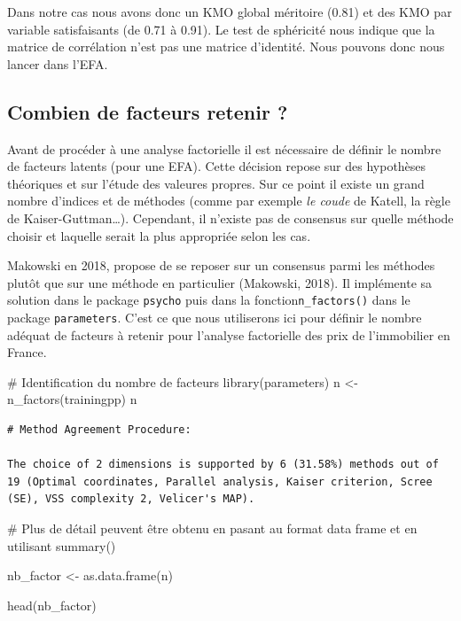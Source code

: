 \documentclass[
  french,
  11pt,
  a4paper,
]{article}
\newenvironment{Shaded}{}{}
\newcommand{\CommentTok}[1]{\textcolor[rgb]{0.42,0.45,0.49}{#1}}
\newcommand{\FunctionTok}[1]{\textcolor[rgb]{0.44,0.26,0.76}{#1}}
\newcommand{\NormalTok}[1]{\textcolor[rgb]{0.14,0.16,0.18}{#1}}
\newcommand{\OtherTok}[1]{\textcolor[rgb]{0.44,0.26,0.76}{#1}}
\begin{document}
Dans notre cas nous avons donc un KMO global méritoire (0.81) et des KMO
par variable satisfaisants (de 0.71 à 0.91). Le test de sphéricité nous
indique que la matrice de corrélation n'est pas une matrice d'identité.
Nous pouvons donc nous lancer dans l'EFA.

\subsection{Combien de facteurs retenir
?}\label{combien-de-facteurs-retenir}

Avant de procéder à une analyse factorielle il est nécessaire de définir
le nombre de facteurs latents (pour une EFA). Cette décision repose sur
des hypothèses théoriques et sur l'étude des valeures propres. Sur ce
point il existe un grand nombre d'indices et de méthodes (comme par
exemple \emph{le coude} de Katell, la règle de Kaiser-Guttman\ldots).
Cependant, il n'existe pas de consensus sur quelle méthode choisir et
laquelle serait la plus appropriée selon les cas.

Makowski en 2018, propose de se reposer sur un consensus parmi les
méthodes plutôt que sur une méthode en particulier (Makowski, 2018). Il
implémente sa solution dans le package \texttt{psycho} puis dans la
fonction\texttt{n\_factors()} dans le package \texttt{parameters}. C'est
ce que nous utiliserons ici pour définir le nombre adéquat de facteurs à
retenir pour l'analyse factorielle des prix de l'immobilier en France.

\begin{Shaded}
\begin{Highlighting}[]
\CommentTok{\# Identification du nombre de facteurs}
\FunctionTok{library}\NormalTok{(parameters)}
\NormalTok{n }\OtherTok{\textless{}{-}} \FunctionTok{n\_factors}\NormalTok{(trainingpp)}
\NormalTok{n}
\end{Highlighting}
\end{Shaded}

\begin{verbatim}
# Method Agreement Procedure:

The choice of 2 dimensions is supported by 6 (31.58%) methods out of 19 (Optimal coordinates, Parallel analysis, Kaiser criterion, Scree (SE), VSS complexity 2, Velicer's MAP).
\end{verbatim}

\begin{Shaded}
\begin{Highlighting}[]
\CommentTok{\# Plus de détail peuvent être obtenu en pasant au format data frame et en utilisant summary()}

\NormalTok{nb\_factor }\OtherTok{\textless{}{-}} \FunctionTok{as.data.frame}\NormalTok{(n)}

\FunctionTok{head}\NormalTok{(nb\_factor)}
\end{Highlighting}
\end{Shaded}
\end{document}
